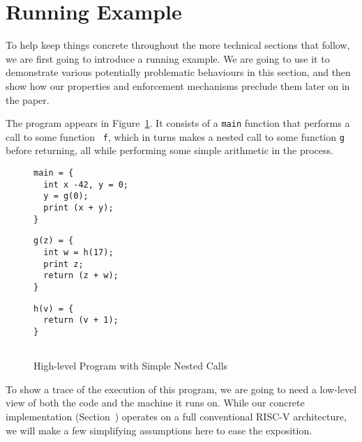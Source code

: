 \documentclass[acmsmall,review,anonymous]{acmart}\settopmatter{printfolios=true,printccs=false,printacmref=false}
\begin{document}
\section{Running Example}
\label{sec:running-example}

To help keep things concrete throughout the more technical sections
that follow, we are first going to introduce a running example. We are
going to use it to demonstrate various potentially problematic
behaviours in this section, and then show how our properties and
enforcement mechanisms preclude them later on in the paper.

The program appears in Figure~\ref{fig:running-program}. It consists
of a {\tt main} function that performs a call to some function {\tt
  f}, which in turns makes a nested call to some function {\tt g}
before returning, all while performing some simple arithmetic
in the process.

\begin{figure}[b]
  \begin{centering}
    \begin{minipage}{.3\textwidth}
\begin{verbatim}
main = {
  int x -42, y = 0;
  y = g(0);
  print (x + y);
}
\end{verbatim}
    \end{minipage}
    \begin{minipage}{.3\textwidth}
\begin{verbatim}
g(z) = {
  int w = h(17);
  print z;
  return (z + w);
}
\end{verbatim}
    \end{minipage}
    \begin{minipage}{.3\textwidth}
\begin{verbatim}
h(v) = {
  return (v + 1);
}


\end{verbatim}
    \end{minipage}
\end{centering}
\caption{High-level Program with Simple Nested Calls}
\label{fig:running-program}
\end{figure}

To show a trace of the execution of this program, we are going to need
a low-level view of both the code and the machine it runs on. While
our concrete implementation (Section~) operates on a full
conventional RISC-V architecture, we will make a few simplifying
assumptions here to ease the exposition. 
\end{document}
